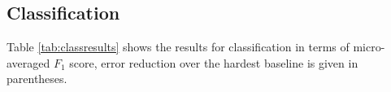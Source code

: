 \documentclass[11pt,a4paper]{article}
\begin{document}






\subsection{Classification}
\label{sec:class}

Table \ref{tab:classresults} shows the results for classification in terms of micro-averaged $F_1$ score, error reduction over the hardest baseline is given in parentheses.
\end{document}

